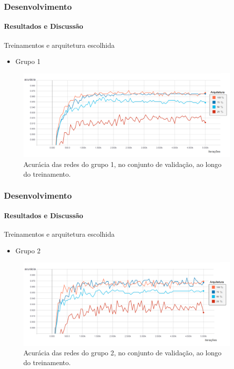 \documentclass{beamer}
\begin{document}
    \begin{frame}[t]
      \frametitle{Desenvolvimento}
      \framesubtitle{Resultados e Discussão}  \medskip  
      	Treinamentos e arquitetura escolhida \medskip    
      	\begin{itemize}
      		\item Grupo 1
		\end{itemize}      	  	
		\begin{figure}[t]
      		 \begin{minipage}[h]{1.0\linewidth}
         		\centering
      			\includegraphics[height=0.42\linewidth]{img/acc_1_5000.png}
      			\caption{Acurácia das redes do grupo 1, no conjunto de validação, ao longo do treinamento.}
      		\end{minipage}
      		\vspace{0.00mm}
      	\end{figure}	      	       
    \end{frame}
    
    \begin{frame}[t]
      \frametitle{Desenvolvimento}
      \framesubtitle{Resultados e Discussão} \medskip       
      	Treinamentos e arquitetura escolhida \medskip    
      	\begin{itemize}
      		\item Grupo 2
		\end{itemize}      	  	
		\begin{figure}[t]
      		 \begin{minipage}[h]{1.0\linewidth}
         		\centering
      			\includegraphics[height=0.42\linewidth]{img/acc_2_5000.png}
      			\caption{Acurácia das redes do grupo 2, no conjunto de validação, ao longo do treinamento.}
      		\end{minipage}
      		\vspace{0.00mm}
      	\end{figure}	      	       
    \end{frame}
    
\end{document}
